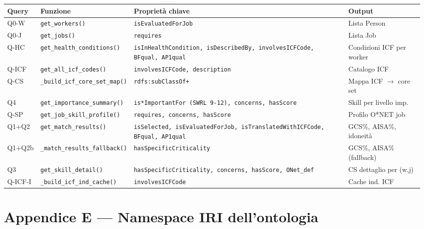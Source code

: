 \documentclass[a4paper,12pt]{article}
\begin{document}
\begin{longtable}{L{1.5cm} L{4cm} L{4.5cm} L{3cm}}
  \toprule
  \textbf{Query} & \textbf{Funzione} & \textbf{Propriet\`{a} chiave} & \textbf{Output} \\
  \midrule
  \endhead
  Q0-W & \texttt{get\_workers()} &
    \texttt{isEvaluatedForJob} &
    Lista Person \\[3pt]
  Q0-J & \texttt{get\_jobs()} &
    \texttt{requires} &
    Lista Job \\[3pt]
  Q-HC & \texttt{get\_health\-\_conditions()} &
    \texttt{isInHealthCondition,\allowbreak{} isDescribedBy,\allowbreak{} involvesICFCode,\allowbreak{} BFqual, AP1qual} &
    Condizioni ICF per worker \\[3pt]
  Q-ICF & \texttt{get\_all\_icf\_codes()} &
    \texttt{involvesICFCode, description} &
    Catalogo ICF \\[3pt]
  Q-CS & {\small\texttt{\_build\_icf\_\allowbreak{}core\_set\_map()}} &
    \texttt{rdfs:subClassOf+} &
    Mappa ICF $\rightarrow$ core set \\[3pt]
  Q4 & \texttt{get\_importance\-\_summary()} &
    \texttt{is*ImportantFor\allowbreak{} (SWRL 9-12),\allowbreak{} concerns, hasScore} &
    Skill per livello imp. \\[3pt]
  Q-SP & \texttt{get\_job\_skill\-\_profile()} &
    \texttt{requires, concerns, hasScore} &
    Profilo O*NET job \\[3pt]
  Q1+Q2 & \texttt{get\_match\_results()} &
    {\footnotesize\texttt{isSelected, isEvaluated\-ForJob, isTranslated\-WithICFCode, BFqual, AP1qual}} &
    GCS\%, AISA\%, idoneit\`{a} \\[3pt]
  Q1+Q2b & {\small\texttt{\_match\_results\-\_fallback()}} &
    {\small\texttt{hasSpecific\-Criticality}} &
    GCS\%, AISA\% (fallback) \\[3pt]
  Q3 & \texttt{get\_skill\_detail()} &
    {\footnotesize\texttt{hasSpecificCriticality,\allowbreak{} concerns,\allowbreak{} hasScore,\allowbreak{} ONet\_def}} &
    CS dettaglio per (w,j) \\[3pt]
  Q-ICF-I & {\small\texttt{\_build\_icf\_\allowbreak{}ind\_cache()}} &
    \texttt{involvesICFCode} &
    Cache ind. ICF \\
  \bottomrule
\end{longtable}

\section*{Appendice E --- Namespace IRI dell'ontologia}
\end{document}
